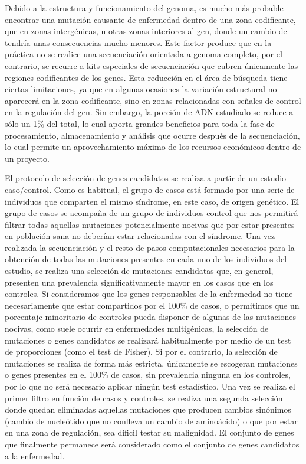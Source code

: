 Debido a la estructura y funcionamiento del genoma, es mucho más probable encontrar una mutación causante de enfermedad dentro de una zona codificante, que en zonas intergénicas, u otras zonas interiores al gen, donde un cambio de tendría unas consecuencias mucho menores. Este factor produce que en la práctica no se realice una secuenciación orientada a genoma completo, por el contrario, se recurre a kits especiales de secuenciación que cubren únicamente las regiones codificantes de los genes. Esta reducción en el área de búsqueda tiene ciertas limitaciones, ya que en algunas ocasiones la variación estructural no aparecerá en la zona codificante, sino en zonas relacionadas con señales de control en la regulación del gen. Sin embargo, la porción de ADN estudiado se reduce a sólo un 1\% del total, lo cual aporta grandes beneficios para toda la fase de procesamiento, almacenamiento y análisis que ocurre después de la secuenciación, lo cual permite un aprovechamiento máximo de los recursos económicos dentro de un proyecto. 

El protocolo de selección de genes candidatos se realiza a partir de un estudio caso/control. Como es habitual, el grupo de casos está formado por una serie de individuos que comparten el mismo síndrome, en este caso, de origen genético. El grupo de casos se acompaña de un grupo de individuos control que nos permitirá filtrar todas aquellas mutaciones potencialmente nocivas que por estar presentes en población sana no deberían estar relacionadas con el síndrome. Una vez realizada la secuenciación y el resto de pasos computacionales necesarios para la obtención de todas las mutaciones presentes en cada uno de los individuos del estudio, se realiza una selección de mutaciones candidatas que, en general, presenten una prevalencia significativamente mayor en los casos que en los controles. Si consideramos que los genes responsables de la enfermedad no tiene necesariamente que estar compartidos por el 100\% de casos, o permitimos que un porcentaje minoritario de controles pueda disponer de algunas de las mutaciones nocivas, como suele ocurrir en enfermedades multigénicas, la selección de mutaciones o genes candidatos se realizará habitualmente por medio de un test de proporciones (como el test de Fisher). Si por el contrario, la selección de mutaciones se realiza de forma más estricta, únicamente se escogeran mutaciones o genes presentes en el 100\% de casos, sin prevalencia ninguna en los controles, por lo que no será necesario aplicar ningún test estadístico. Una vez se realiza el primer filtro en función de casos y controles, se realiza una segunda selección donde quedan eliminadas aquellas mutaciones que producen cambios sinónimos (cambio de nucleótido que no conlleva un cambio de aminoácido)  o que por estar en una zona de regulación, sea dificil testar su malignidad. El conjunto de genes que finalmente permanece será considerado como el conjunto de genes candidatos a la enfermedad. 


